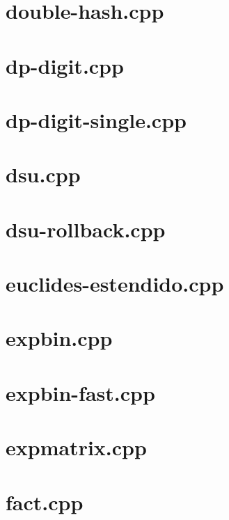 \documentclass[a4paper,12pt]{article}
\begin{document}
\section{double-hash.cpp}


\section{dp-digit.cpp}


\section{dp-digit-single.cpp}


\section{dsu.cpp}


\section{dsu-rollback.cpp}


\section{euclides-estendido.cpp}


\section{expbin.cpp}


\section{expbin-fast.cpp}


\section{expmatrix.cpp}


\section{fact.cpp}

\end{document}
